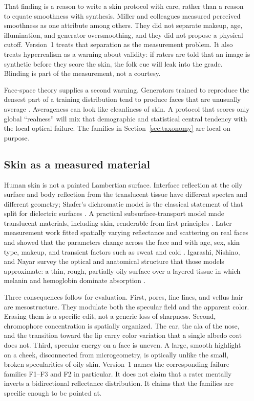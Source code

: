 \documentclass[10pt,twocolumn]{article}
\begin{document}
That finding is a reason to write a skin protocol with care, rather than a reason to equate smoothness with synthesis. Miller and colleagues measured perceived smoothness as one attribute among others. They did not separate makeup, age, illumination, and generator oversmoothing, and they did not propose a physical cutoff. Version~1 treats that separation as the measurement problem. It also treats hyperrealism as a warning about validity: if raters are told that an image is synthetic before they score the skin, the folk cue will leak into the grade. Blinding is part of the measurement, not a courtesy.

Face-space theory supplies a second warning. Generators trained to reproduce the densest part of a training distribution tend to produce faces that are unusually average \cite{valentine1991,karras2020stylegan2,miller2023}. Averageness can look like cleanliness of skin. A protocol that scores only global ``realness'' will mix that demographic and statistical central tendency with the local optical failure. The families in Section~\ref{sec:taxonomy} are local on purpose.

\subsection{Skin as a measured material}

Human skin is not a painted Lambertian surface. Interface reflection at the oily surface and body reflection from the translucent tissue have different spectra and different geometry; Shafer's dichromatic model is the classical statement of that split for dielectric surfaces \cite{shafer1985}. A practical subsurface-transport model made translucent materials, including skin, renderable from first principles \cite{jensen2001}. Later measurement work fitted spatially varying reflectance and scattering on real faces and showed that the parameters change across the face and with age, sex, skin type, makeup, and transient factors such as sweat and cold \cite{weyrich2006,donner2008}. Igarashi, Nishino, and Nayar survey the optical and anatomical structure that those models approximate: a thin, rough, partially oily surface over a layered tissue in which melanin and hemoglobin dominate absorption \cite{igarashi2007}.

Three consequences follow for evaluation. First, pores, fine lines, and vellus hair are mesostructure. They modulate both the specular field and the apparent color. Erasing them is a specific edit, not a generic loss of sharpness. Second, chromophore concentration is spatially organized. The ear, the ala of the nose, and the transition toward the lip carry color variation that a single albedo coat does not. Third, specular energy on a face is uneven. A large, smooth highlight on a cheek, disconnected from microgeometry, is optically unlike the small, broken specularities of oily skin. Version~1 names the corresponding failure families F1--F3 and F2 in particular. It does not claim that a rater mentally inverts a bidirectional reflectance distribution. It claims that the families are specific enough to be pointed at.
\end{document}
